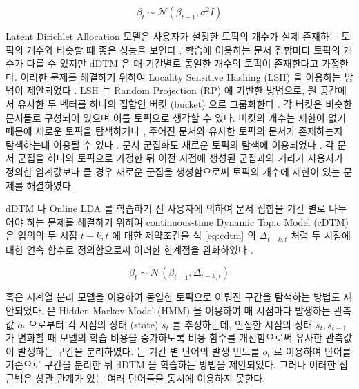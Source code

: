 \documentclass[oneside, ko,phd]{snuthesis_utf8_kor}
\begin{document}
\begin{equation}
\label{eq:dtm}
\beta_t \sim \mathcal{N}(\beta_{t-1}, \sigma^2 \mathit{I})
\end{equation}

Latent Dirichlet Allocation 모델은 사용자가 설정한 토픽의 개수가 실제 존재하는 토픽의 개수와 비슷할 때 좋은 성능을 보인다 \cite{alsumait2009topic, lau2012line}.
학습에 이용하는 문서 집합마다 토픽의 개수가 다를 수 있지만 dDTM 은 매 기간별로 동일한 개수의 토픽이 존재한다고 가정한다.
이러한 문제를 해결하기 위하여 Locality Sensitive Hashing (LSH) 을 이용하는 방법이 제안되었다 \cite{wurzer2015tracking}.
LSH 는 Random Projection (RP) \cite{bingham2001random} 에 기반한 방법으로, 원 공간에서 유사한 두 벡터를 하나의 집합인 버킷 (bucket) 으로 그룹화한다 \cite{indyk1998approximate, charikar2002similarity}.
각 버킷은 비슷한 문서들로 구성되어 있으며 이를 토픽으로 생각할 수 있다.
버킷의 개수는 제한이 없기 때문에 새로운 토픽을 탐색하거나 \cite{ding2013topic}, 주어진 문서와 유사한 토픽의 문서가 존재하는지 탐색하는데 이용될 수 있다 \cite{zhang2010self, sundaram2013streaming}.
문서 군집화도 새로운 토픽의 탐색에 이용되었다 \cite{yang2012framework, wurzer2015tracking}.
각 문서 군집을 하나의 토픽으로 가정한 뒤 이전 시점에 생성된 군집과의 거리가 사용자가 정의한 임계값보다 클 경우 새로운 군집을 생성함으로써 토픽의 개수에 제한이 있는 문제를 해결하였다.

dDTM 나 Online LDA 를 학습하기 전 사용자에 의하여 문서 집합을 기간 별로 나누어야 하는 문제를 해결하기 위하여  continuous-time Dynamic Topic Model (cDTM) 은 임의의 두 시점 $t-k, t$ 에 대한 제약조건을 식 \ref{eq:cdtm} 의 $\Delta_{t-k, t}$ 처럼 두 시점에 대한 연속 함수로 정의함으로써 이러한 한계점을 완화하였다 \cite{wang2012continuous}. 

\begin{equation}
\label{eq:cdtm}
\beta_t \sim \mathcal{N}(\beta_{t-1}, \Delta_{t-k, t})
\end{equation}

혹은 시계열 분리 모델을 이용하여 동일한 토픽으로 이뤄진 구간을 탐색하는 방법도 제안되었다.
\cite{kleinberg2003bursty} 은 Hidden Markov Model (HMM) 을 이용하여 매 시점마다 발생하는 관측값 $o_t$ 으로부터 각 시점의 상태 (state) $s_t$ 를 추정하는데, 인접한 시점의 상태 $s_t, s_{t-1}$ 가 변화할 때 모델의 학습 비용을 증가하도록 비용 함수를 개선함으로써 유사한 관측값이 발생하는 구간을 분리하였다.
\cite{takahashi2012applying, huang2017probabilistic} 는 기간 별 단어의 발생 빈도를 $o_t$ 로 이용하여 단어를 기준으로 구간을 분리한 뒤 dDTM 을 학습하는 방법을 제안되었다.
그러나 이러한 접근법은 상관 관계가 있는 여러 단어들을 동시에 이용하지 못한다.
\end{document}

